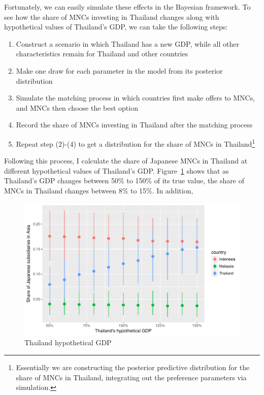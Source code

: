 Fortunately, we can easily simulate these effects in the Bayesian framework. To
see how the share of MNCs investing in Thailand changes along with hypothetical
values of Thailand's GDP, we can take the following steps:

\begin{enumerate}
  \item Construct a scenario in which Thailand has a new GDP, while all other
    characteristics remain for Thailand and other countries
  \item Make one draw for each parameter in the model from its posterior
    distribution
  \item Simulate the matching process in which countries first make offers to
    MNCs, and MNCs then choose the best option
  \item Record the share of MNCs investing in Thailand after the matching process
  \item Repeat step (2)-(4) to get a distribution for the share of MNCs in
    Thailand\footnote{Essentially we are constructing the posterior predictive
      distribution for the share of MNCs in Thailand, integrating out the
      preference parameters via simulation.}
\end{enumerate}

Following this process, I calculate the share of Japanese MNCs in Thailand at
different hypothetical values of Thailand's GDP.
Figure~\ref{fig:japan96_effect_GDP_on_share_of_MNCs} shows that as Thailand's
GDP changes between 50\% to 150\% of its true value, the share of MNCs in
Thailand changes between 8\% to 15\%. In addition, 

\begin{figure}[!ht]
  \centering
  \includegraphics[width=\textwidth,keepaspectratio]{../figure/japan96_effect_GDP_on_share_of_MNCs}
  \caption{Thailand hypothetical GDP}
  \label{fig:japan96_effect_GDP_on_share_of_MNCs}
\end{figure}

